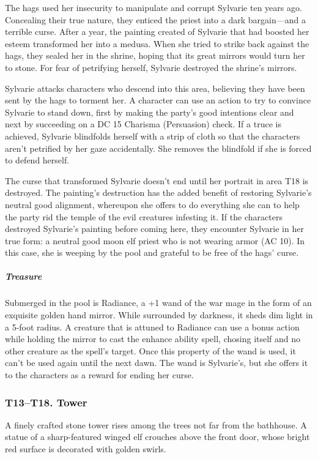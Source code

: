 \documentclass[10pt,a4paper,twoside,bg=print,twocolumn,openany,nodeprecatedcode]{dndbook}
\begin{document}
The hags used her insecurity to manipulate and corrupt Sylvarie ten years ago. Concealing their true nature, they enticed the priest into a dark bargain—and a terrible curse. After a year, the painting created of Sylvarie that had boosted her esteem transformed her into a medusa. When she tried to strike back against the hags, they sealed her in the shrine, hoping that its great mirrors would turn her to stone. For fear of petrifying herself, Sylvarie destroyed the shrine's mirrors.

Sylvarie attacks characters who descend into this area, believing they have been sent by the hags to torment her. A character can use an action to try to convince Sylvarie to stand down, first by making the party's good intentions clear and next by succeeding on a DC 15 Charisma (Persuasion) check. If a truce is achieved, Sylvarie blindfolds herself with a strip of cloth so that the characters aren't petrified by her gaze accidentally. She removes the blindfold if she is forced to defend herself.

The curse that transformed Sylvarie doesn't end until her portrait in area T18 is destroyed. The painting's destruction has the added benefit of restoring Sylvarie's neutral good alignment, whereupon she offers to do everything she can to help the party rid the temple of the evil creatures infesting it. If the characters destroyed Sylvarie's painting before coming here, they encounter Sylvarie in her true form: a neutral good moon elf priest who is not wearing armor (AC 10). In this case, she is weeping by the pool and grateful to be free of the hags' curse.

\subparagraph{Treasure}
Submerged in the pool is Radiance, a +1 wand of the war mage in the form of an exquisite golden hand mirror. While surrounded by darkness, it sheds dim light in a 5-foot radius. A creature that is attuned to Radiance can use a bonus action while holding the mirror to cast the enhance ability spell, chosing itself and no other creature as the spell's target. Once this property of the wand is used, it can't be used again until the next dawn. The wand is Sylvarie's, but she offers it to the characters as a reward for ending her curse.

\subsubsection{T13–T18. Tower}
\begin{DndReadAloud}{}
A finely crafted stone tower rises among the trees not far from the bathhouse. A statue of a sharp-featured winged elf crouches above the front door, whose bright red surface is decorated with golden swirls.

\end{DndReadAloud}
\end{document}
